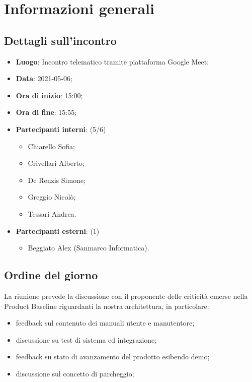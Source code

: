 \section{Informazioni generali}

\subsection{Dettagli sull'incontro}
\begin{itemize}
\item \textbf{Luogo}: Incontro telematico tramite piattaforma Google Meet;
\item \textbf{Data}: 2021-05-06;
\item \textbf{Ora di inizio}: 15:00;
\item \textbf{Ora di fine}: 15:55;
\item \textbf{Partecipanti interni}: (5/6)
\begin{itemize}
	\item Chiarello Sofia;
	\item Crivellari Alberto;
	\item De Renzis Simone;
	\item Greggio Nicolò;
	\item Tessari Andrea.
\end{itemize}
\item \textbf{Partecipanti esterni}: (1)
\begin{itemize}
	\item Beggiato Alex (Sanmarco Informatica).
\end{itemize}
\end{itemize}

\subsection{Ordine del giorno}

La riunione prevede la discussione con il proponente delle criticità emerse nella Product Baseline riguardanti la nostra architettura, in particolare:
\begin{itemize}
    \item feedback sul contenuto dei manuali utente e manutentore;
    \item discussione su test di sistema ed integrazione;
    \item feedback su stato di avanzamento del prodotto esibendo demo;
    \item discussione sul concetto di parcheggio;
\end{itemize}




